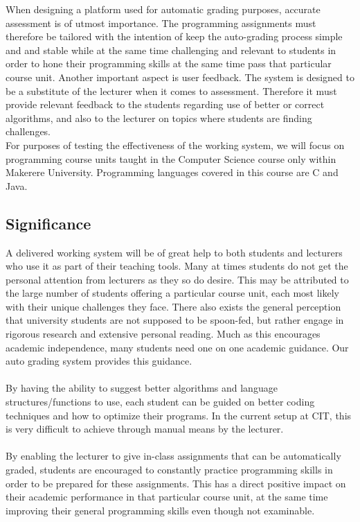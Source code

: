 \documentclass[12pt]{article}
\begin{document}
		\noindent When designing a platform used for automatic grading purposes, accurate assessment is of utmost importance. The programming assignments must therefore be tailored with the intention of keep the auto-grading process simple and and stable while at the same time challenging and relevant to students in order to hone their programming skills at the same time pass that particular course unit. Another important aspect is user feedback. The system is designed to be a substitute of the lecturer when it comes to assessment. Therefore it must provide relevant feedback to the students regarding use of better or correct algorithms, and also to the lecturer on topics where students are finding challenges.\\
		
		\noindent For purposes of testing the effectiveness of the working system, we will focus on
		programming course units taught in the Computer Science course only within Makerere
		University. Programming languages covered in this course are C and Java.

	\subsection{Significance}
			A delivered working system will be of great help to both students and lecturers who use it
		as part of their teaching tools. Many at times students do not get the personal attention
		from lecturers as they so do desire. This may be attributed to the large number of students
		offering a particular course unit, each most likely with their unique challenges they face.
		There also exists the general perception that university students are not supposed to be
		spoon-fed, but rather engage in rigorous research and extensive personal reading. Much
		as this encourages academic independence, many students need one on one academic
		guidance. Our auto grading system provides this guidance. \\ \\
			By having the ability to suggest better algorithms and language structures/functions to use,
		each student can be guided on better coding techniques and how to optimize their programs. In the current setup at 				CIT, this is very difficult to achieve through manual means by the lecturer. \\ \\
			By enabling the lecturer to give in-class assignments that can be automatically graded,
		students are encouraged to constantly practice programming skills in order to be prepared
		for these assignments. This has a direct positive impact on their academic performance in
		that particular course unit, at the same time improving their general programming skills
		even though not examinable. 
\end{document}
